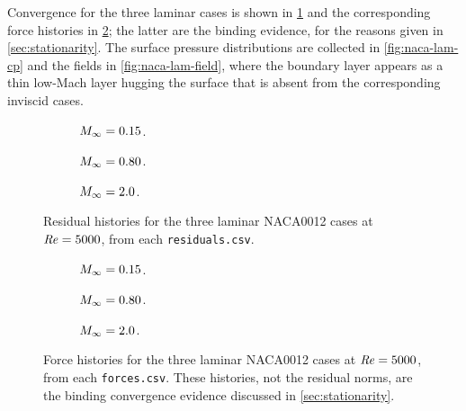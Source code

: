 Convergence for the three laminar cases is shown in \cref{fig:naca-lam-res} and
the corresponding force histories in \cref{fig:naca-lam-forces}; the latter are
the binding evidence, for the reasons given in \cref{sec:stationarity}. The
surface pressure distributions are collected in \cref{fig:naca-lam-cp} and the
fields in \cref{fig:naca-lam-field}, where the boundary layer appears as a thin
low-Mach layer hugging the surface that is absent from the corresponding inviscid
cases.

\begin{figure}[htbp]
  \centering
  \begin{subfigure}{0.32\textwidth}\centering
    \caption{$M_\infty=0.15$.}
  \end{subfigure}\hfill
  \begin{subfigure}{0.32\textwidth}\centering
    \caption{$M_\infty=0.80$.}
  \end{subfigure}\hfill
  \begin{subfigure}{0.32\textwidth}\centering
    \caption{$M_\infty=2.0$.}
  \end{subfigure}
  \caption{Residual histories for the three laminar NACA0012 cases at
  $\mathit{Re}=5000$, from each \texttt{residuals.csv}.}
  \label{fig:naca-lam-res}
\end{figure}

\begin{figure}[htbp]
  \centering
  \begin{subfigure}{0.32\textwidth}\centering
    \caption{$M_\infty=0.15$.}
  \end{subfigure}\hfill
  \begin{subfigure}{0.32\textwidth}\centering
    \caption{$M_\infty=0.80$.}
  \end{subfigure}\hfill
  \begin{subfigure}{0.32\textwidth}\centering
    \caption{$M_\infty=2.0$.}
  \end{subfigure}
  \caption{Force histories for the three laminar NACA0012 cases at
  $\mathit{Re}=5000$, from each \texttt{forces.csv}. These histories, not the residual
  norms, are the binding convergence evidence discussed in
  \cref{sec:stationarity}.}
  \label{fig:naca-lam-forces}
\end{figure}

